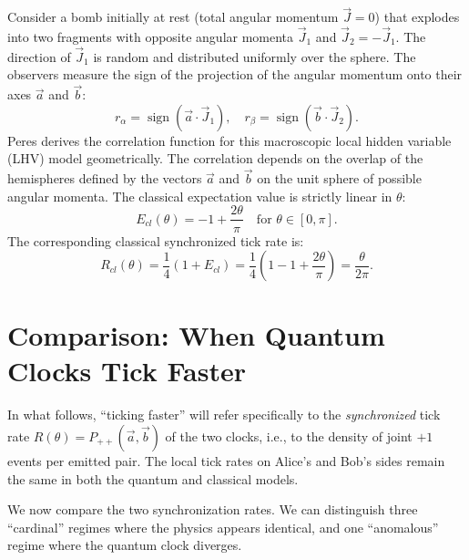 \documentclass[entropy,article,submit,moreauthors,pdftex]{Definitions/mdpi}
\DeclareMathOperator{\sign}{sign}
\begin{document}
Consider a bomb initially at rest (total angular momentum $\vec{J}=0$) that explodes into two fragments with opposite angular momenta $\vec{J}_1$ and $\vec{J}_2 = -\vec{J}_1$. The direction of $\vec{J}_1$ is random and distributed uniformly over the sphere. The observers measure the sign of the projection of the angular momentum onto their axes $\vec{a}$ and $\vec{b}$:
\begin{equation}
r_\alpha = \sign(\vec{a} \cdot \vec{J}_1), \quad r_\beta = \sign(\vec{b} \cdot \vec{J}_2).
\end{equation}
Peres derives the correlation function for this macroscopic local hidden variable (LHV) model geometrically. The correlation depends on the overlap of the hemispheres defined by the vectors $\vec{a}$ and $\vec{b}$ on the unit sphere of possible angular momenta. The classical expectation value is strictly linear in $\theta$:
\begin{equation}
E_{cl}(\theta) = -1 + \frac{2\theta}{\pi} \quad \text{for } \theta \in [0, \pi].
\label{eq:peres_corr}
\end{equation}
The corresponding classical synchronized tick rate is:
\begin{equation}
R_{cl}(\theta) = \frac{1}{4}(1 + E_{cl}) = \frac{1}{4}\left(1 - 1 + \frac{2\theta}{\pi}\right) = \frac{\theta}{2\pi}.
\label{eq:cl_rate}
\end{equation}

\section{Comparison: When Quantum Clocks Tick Faster}

In what follows, ``ticking faster'' will refer specifically to the \emph{synchronized} tick rate $R(\theta) = P_{++}(\vec a,\vec b)$ of the two clocks, i.e., to the density of joint $+1$ events per emitted pair. The local tick rates on Alice's and Bob's sides remain the same in both the quantum and classical models.

We now compare the two synchronization rates. We can distinguish three ``cardinal'' regimes where the physics appears identical, and one ``anomalous'' regime where the quantum clock diverges.
\end{document}
